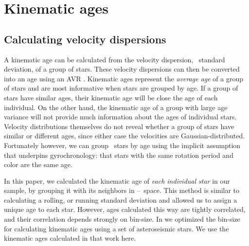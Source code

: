 \section{Kinematic ages}
\subsection{Calculating velocity dispersions}
\label{sec:velocity_dispersion}

A kinematic age can be calculated from the velocity dispersion, \ie\ standard
deviation, of a group of stars.
These velocity dispersions can then be converted into an age using an AVR
\citep[\eg][]{holmberg2009, yu2018}.
Kinematic ages represent the {\it average age} of a group of stars and are
most informative when stars are grouped by age.
If a group of stars have similar ages, their kinematic age will be close
the age of each individual.
On the other hand, the kinematic age of a group with large age variance will
not provide much information about the ages of individual stars.
Velocity distributions themselves do not reveal whether a group of stars have
similar or different ages, since either case the velocities are
Gaussian-distributed.
Fortunately however, we can group \kepler\ stars by age using the implicit
assumption that underpins gyrochronology: that stars with the same rotation
period and color are the same age.

In this paper, we calculated the kinematic age of {\it each individual star}
in our sample, by grouping it with its neighbors in \logp--\teff\ space.
This method is similar to calculating a rolling, or running standard
deviation and allowed us to assign a unique age to each star.
However, ages calculated this way are tightly correlated, and their
correlation depends strongly on bin-size.
In \citet{lu2021} we optimized the bin-size for calculating kinematic ages
using a set of asteroseismic stars.
We use the kinematic ages calculated in that work here.


